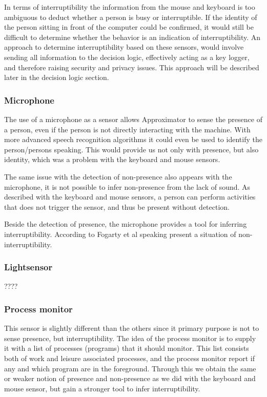 \documentclass{sigchi}
\begin{document}
In terms of interruptibility the information from the mouse and keyboard is too ambiguous to deduct whether a person is busy or interruptible.
If the identity of the person sitting in front of the computer could be confirmed, it would still be difficult to determine whether the behavior is an indication of interruptibility.
An approach to determine interruptibility based on these sensors, would involve sending all information to the decision logic, effectively acting as a key logger, and therefore raising security and privacy issues.
This approach will be described later in the decision logic section.

\subsubsection{Microphone}
The use of a microphone as a sensor allows Approximator to sense the presence of a person, even if the person is not directly interacting with the machine.
With more advanced speech recognition algorithms it could even be used to identify the person/persons speaking.
This would provide us not only with presence, but also identity, which was a problem with the keyboard and mouse sensors.

The same issue with the detection of non-presence also appears with the microphone, it is not possible to infer non-presence from the lack of sound.
As described with the keyboard and mouse sensors, a person can perform activities that does not trigger the sensor, and thus be present without detection.

Beside the detection of presence, the microphone provides a tool for inferring interruptibility.
According to Fogarty et al\cite{fogarty2005predicting} speaking present a situation of non-interruptibility.
\subsubsection{Lightsensor}
????

\subsubsection{Process monitor}
This sensor is slightly different than the others since it primary purpose is not to sense presence, but interruptibility.
The idea of the process monitor is to supply it with a list of processes (programs) that it should monitor.
This list consists both of work and leisure associated processes, and the process monitor report if any and which program are in the foreground. %
Through this we obtain the same or weaker notion of presence and non-presence as we did with the keyboard and mouse sensor, but gain a stronger tool to infer interruptibility.
\end{document}
